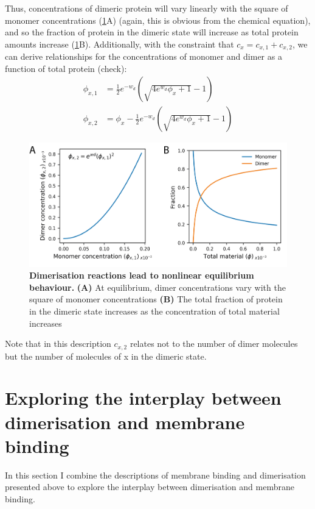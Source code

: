 \documentclass[12pt]{"report"}
\newcommand{\mycaption}[2]{\caption[#1]{\textbf{#1.} #2}}
\begin{document}
Thus, concentrations of dimeric protein will vary linearly with the square of monomer concentrations (\cref{fig:thermodynamic_simple_dimer}A) (again, this is obvious from the chemical equation), and so the fraction of protein in the dimeric state will increase as total protein amounts increase (\cref{fig:thermodynamic_simple_dimer}B). Additionally, with the constraint that $c_x = c_{x,1} + c_{x,2}$, we can derive relationships for the concentrations of monomer and dimer as a function of total protein (check):
\begin{align}
\phi_{x,1} &= \frac{1}{2}e^{-w_d}\left(\sqrt{4e^{w_d}\phi_x + 1} - 1\right)\\
\phi_{x,2} &= \phi_x - \frac{1}{2}e^{-w_d}\left(\sqrt{4e^{w_d}\phi_x + 1} - 1\right)
\end{align}

\begin{figure}
\includegraphics[scale=1]{thermodynamic_simple_dimer}
\centering
\mycaption{Dimerisation reactions lead to nonlinear equilibrium behaviour}{
\textbf{(A)} At equilibrium, dimer concentrations vary with the square of monomer concentrations
\textbf{(B)} The total fraction of protein in the dimeric state increases as the concentration of total material increases
}
\label{fig:thermodynamic_simple_dimer}
\end{figure}

Note that in this description $c_{x,2}$ relates not to the number of dimer molecules but the number of molecules of x in the dimeric state.\\

\clearpage
\section{Exploring the interplay between dimerisation and membrane binding}

In this section I combine the descriptions of membrane binding and dimerisation presented above to explore the interplay between dimerisation and membrane binding.
\end{document}
